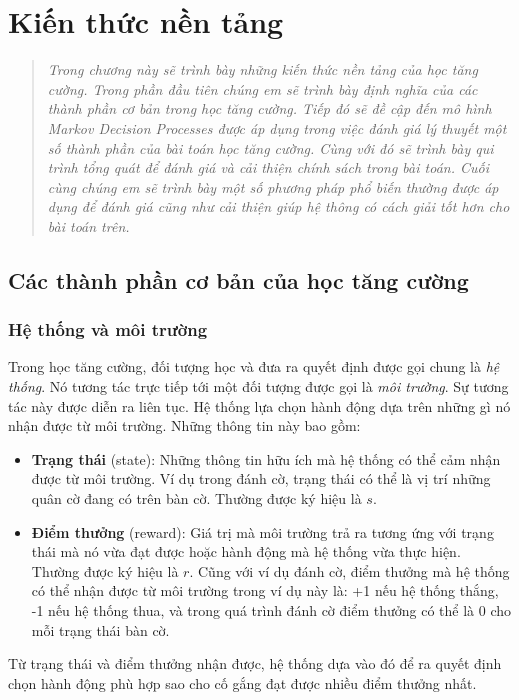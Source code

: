 \chapter{Kiến thức nền tảng}
\ifpdf
\graphicspath{{Chapter2/Chapter2Figs/PNG/}{Chapter2/Chapter2Figs/PDF/}{Chapter2/Chapter2Figs/}}
\else
\graphicspath{{Chapter2/Chapter2Figs/EPS/}{Chapter2/Chapter2Figs/}}
\fi
\begin{quote}
	\textit{Trong chương này sẽ trình bày những kiến thức nền tảng của học tăng cường. Trong phần đầu tiên chúng em sẽ trình bày định nghĩa của các thành phần cơ bản trong học tăng cường. Tiếp đó sẽ đề cập đến mô hình Markov Decision Processes được áp dụng trong việc đánh giá lý thuyết một số thành phần của bài toán học tăng cường. Cùng với đó sẽ trình bày qui trình tổng quát để đánh giá và cải thiện chính sách trong bài toán. Cuối cùng chúng em sẽ trình bày một số phương pháp phổ biến thường được áp dụng để đánh giá cũng như cải thiện giúp hệ thông có cách giải tốt hơn cho bài toán trên.}
\end{quote}

\section{Các thành phần cơ bản của học tăng cường}
\subsection{Hệ thống và môi trường}
Trong học tăng cường, đối tượng học và đưa ra quyết định được gọi chung là \textit{hệ thống}. Nó tương tác trực tiếp tới một đối tượng được gọi là \textit{môi trường}. Sự tương tác này được diễn ra liên tục. Hệ thống lựa chọn hành động dựa trên những gì nó nhận được từ môi trường. Những thông tin này bao gồm:
\begin{itemize}
	\item \textbf{Trạng thái} (state): Những thông tin hữu ích mà hệ thống có thể cảm nhận được từ môi trường. Ví dụ trong đánh cờ, trạng thái có thể là vị trí những quân cờ đang có trên bàn cờ. Thường được ký hiệu là $s$.
	\item \textbf{Điểm thưởng} (reward): Giá trị mà môi trường trả ra tương ứng với trạng thái mà nó vừa đạt được hoặc hành động mà hệ thống vừa thực hiện. Thường được ký hiệu là $r$. Cũng với ví dụ đánh cờ, điểm thưởng mà hệ thống có thể nhận được từ môi trường trong ví dụ này là: +1 nếu hệ thống thắng, -1 nếu hệ thống thua, và trong quá trình đánh cờ điểm thưởng có thể là 0 cho mỗi trạng thái bàn cờ.
\end{itemize}
Từ trạng thái và điểm thưởng nhận được, hệ thống dựa vào đó để ra quyết định chọn hành động phù hợp sao cho cố gắng đạt được nhiều điểm thưởng nhất.

